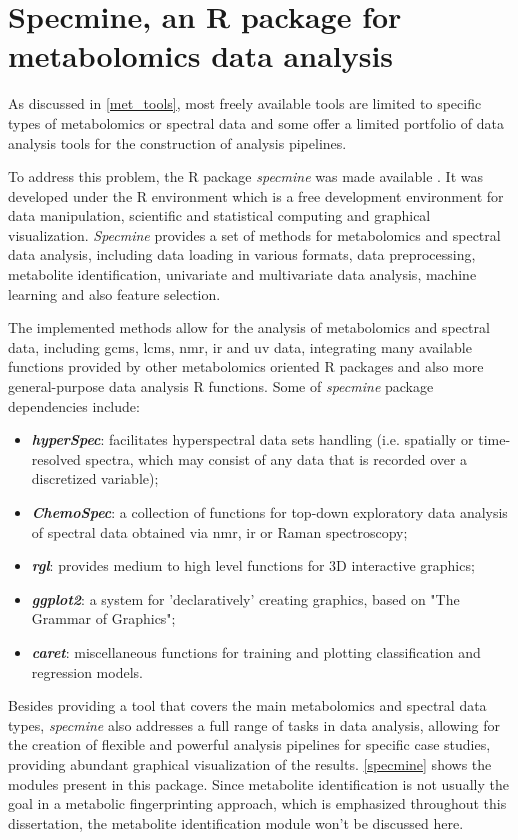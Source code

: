 
\section{Specmine, an R package for metabolomics data analysis} \label{specmine_chapter}

As discussed in \autoref{met_tools}, most freely available tools are limited to specific types of metabolomics or spectral data and some offer a limited portfolio of data analysis tools for the construction of analysis pipelines. 

To address this problem, the R package \textit{specmine} was made available \citep{costa2016r}. It was developed under the R environment which is a free development environment for data manipulation, scientific and statistical computing and graphical visualization. \textit{Specmine} provides a set of methods for metabolomics and spectral data analysis, including data loading in various formats, data preprocessing, metabolite identification, univariate and multivariate data analysis, machine learning and also feature selection. 

The implemented methods allow for the analysis of metabolomics and spectral data, including \gls{gcms}, \gls{lcms}, \gls{nmr}, \gls{ir} and \gls{uv} data, integrating many available functions provided by other metabolomics oriented R packages and also more general-purpose data analysis R functions. Some of \textit{specmine} package dependencies include:

\begin{itemize}
	\item \textit{\textbf{hyperSpec}}: facilitates hyperspectral data sets handling (i.e. spatially or time-resolved spectra, which may consist of any data that is recorded over a discretized variable);
	\item \textit{\textbf{ChemoSpec}}: a collection of functions for top-down exploratory data analysis of spectral data obtained via \gls{nmr}, \gls{ir} or Raman spectroscopy;
	\item \textit{\textbf{rgl}}: provides medium to high level functions for 3D interactive graphics;
	\item \textit{\textbf{ggplot2}}: a system for 'declaratively' creating graphics, based on "The Grammar of Graphics";
	\item \textit{\textbf{caret}}: miscellaneous functions for training and plotting classification and regression models.
\end{itemize}

Besides providing a tool that covers the main metabolomics and spectral data types, \textit{specmine} also addresses a full range of tasks in data analysis, allowing for the creation of flexible and powerful analysis pipelines for specific case studies, providing abundant graphical visualization of the results. \autoref{specmine} shows the modules present in this package. Since metabolite identification is not usually the goal in a metabolic fingerprinting approach, which is emphasized throughout this dissertation, the metabolite identification module won't be discussed here.

